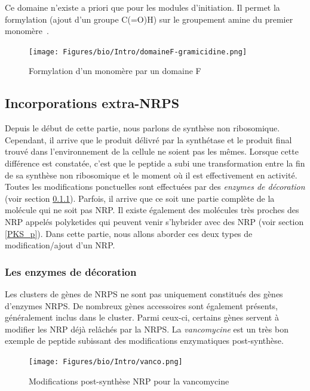 Ce domaine n'existe a priori que pour les modules d'initiation.
Il permet la formylation (ajout d'un groupe C(=O)H) sur le groupement amine du premier monomère~\cite{schonafinger_amide_2007}.

\begin{figure}[h!]
  \begin{center}
    \texttt{[image: Figures/bio/Intro/domaineF-gramicidine.png]}
    \caption{\label{domaine_F}Formylation d'un monomère par un domaine F}
  \end{center}
\end{figure}


\subsection{Incorporations extra-NRPS}

Depuis le début de cette partie, nous parlons de synthèse non ribosomique.
Cependant, il arrive que le produit délivré par la synthétase et le produit final trouvé dans l'environnement de la cellule ne soient pas les mêmes.
Lorsque cette différence est constatée, c'est que le peptide a subi une transformation entre la fin de sa synthèse non ribosomique et le moment où il est effectivement en activité.
Toutes les modifications ponctuelles sont effectuées par des \textit{enzymes de décoration} (voir section \ref{sucres}).
Parfois, il arrive que ce soit une partie complète de la molécule qui ne soit pas NRP.
Il existe également des molécules très proches des NRP appelés polyketides qui peuvent venir s'hybrider avec des NRP (voir section \ref{PKS_p}).
Dans cette partie, nous allons aborder ces deux types de modification/ajout d'un NRP.


\subsubsection{Les enzymes de décoration}

\label{sucres}

Les clusters de gènes de NRPS ne sont pas uniquement constitués des gènes d'enzymes NRPS.
De nombreux gènes accessoires sont également présents, généralement inclus dans le cluster.
Parmi ceux-ci, certains gènes servent à modifier les NRP déjà relâchés par la NRPS.
La \textit{vancomycine} est un très bon exemple de peptide subissant des modifications enzymatiques post-synthèse.

\begin{figure}[h!]
  \begin{center}
    \texttt{[image: Figures/bio/Intro/vanco.png]}
    \caption{\label{vanco}Modifications post-synthèse NRP pour la vancomycine}
  \end{center}
\end{figure}

